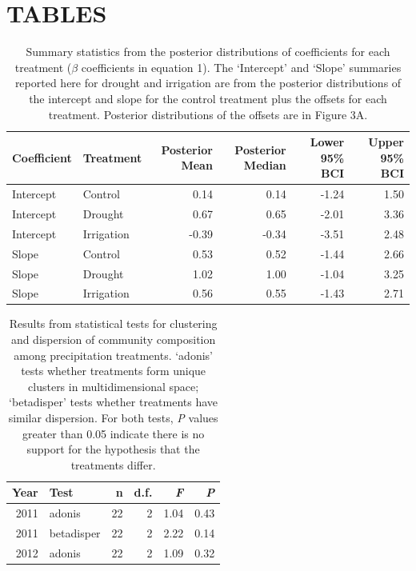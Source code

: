 \documentclass[fleqn,10pt,lineno]{wlpeerj} %
\begin{document}
\newpage{}

\hypertarget{tables}{%
\section{TABLES}\label{tables}}

\begin{table}[ht]
\centering
\caption{Summary statistics from the posterior distributions of coefficients for each treatment ($\beta$ coefficients in equation 1). The `Intercept' and `Slope' summaries reported here for drought and irrigation are from the posterior distributions of the intercept and slope for the control treatment plus the offsets for each treatment. Posterior distributions of the offsets are in Figure 3A.} 
\begingroup\normalsize
\begin{tabular}{llrrrr}
  \hline
Coefficient & Treatment & Posterior Mean & Posterior Median & Lower 95\% BCI & Upper 95\% BCI \\ 
  \hline
Intercept & Control & 0.14 & 0.14 & -1.24 & 1.50 \\ 
  Intercept & Drought & 0.67 & 0.65 & -2.01 & 3.36 \\ 
  Intercept & Irrigation & -0.39 & -0.34 & -3.51 & 2.48 \\ 
  Slope & Control & 0.53 & 0.52 & -1.44 & 2.66 \\ 
  Slope & Drought & 1.02 & 1.00 & -1.04 & 3.25 \\ 
  Slope & Irrigation & 0.56 & 0.55 & -1.43 & 2.71 \\ 
   \hline
\end{tabular}
\endgroup
\end{table}\begin{table}[ht]
\centering
\caption{Results from statistical tests for clustering and dispersion of community composition among precipitation treatments. `adonis' tests whether treatments form unique clusters in multidimensional space; `betadisper' tests whether treatments have similar dispersion. For both tests, \emph{P} values greater than 0.05 indicate there is no support for the hypothesis that the treatments differ.} 
\begingroup\normalsize
\begin{tabular}{rlrrrr}
  \hline
Year & Test & n & d.f. & \emph{F} & \emph{P} \\ 
  \hline
2011 & adonis &  22 &   2 & 1.04 & 0.43 \\ 
  2011 & betadisper &  22 &   2 & 2.22 & 0.14 \\ 
  2012 & adonis &  22 &   2 & 1.09 & 0.32 \\ 

\end{tabular}
\end{table}
\end{document}
